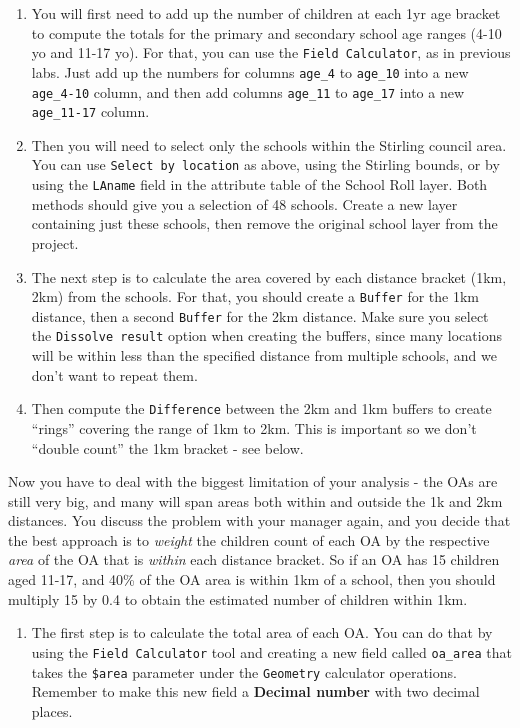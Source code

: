 \documentclass[
  letterpaper,
  DIV=11,
  numbers=noendperiod]{scrreprt}
\providecommand{\tightlist}{%
  \setlength{\itemsep}{0pt}\setlength{\parskip}{0pt}}\usepackage{longtable,booktabs,array}
\begin{document}
\begin{enumerate}
\def\labelenumi{(\arabic{enumi})}
\setcounter{enumi}{289}
\item
  You will first need to add up the number of children at each 1yr age
  bracket to compute the totals for the primary and secondary school age
  ranges (4-10 yo and 11-17 yo). For that, you can use the
  \texttt{Field\ Calculator}, as in previous labs. Just add up the
  numbers for columns \texttt{age\_4} to \texttt{age\_10} into a new
  \texttt{age\_4-10} column, and then add columns \texttt{age\_11} to
  \texttt{age\_17} into a new \texttt{age\_11-17} column.
\item
  Then you will need to select only the schools within the Stirling
  council area. You can use \texttt{Select\ by\ location} as above,
  using the Stirling bounds, or by using the \texttt{LAname} field in
  the attribute table of the School Roll layer. Both methods should give
  you a selection of 48 schools. Create a new layer containing just
  these schools, then remove the original school layer from the project.
\item
  The next step is to calculate the area covered by each distance
  bracket (1km, 2km) from the schools. For that, you should create a
  \texttt{Buffer} for the 1km distance, then a second \texttt{Buffer}
  for the 2km distance. Make sure you select the
  \texttt{Dissolve\ result} option when creating the buffers, since many
  locations will be within less than the specified distance from
  multiple schools, and we don't want to repeat them.
\item
  Then compute the \texttt{Difference} between the 2km and 1km buffers
  to create ``rings'' covering the range of 1km to 2km. This is
  important so we don't ``double count'' the 1km bracket - see below.
\end{enumerate}

Now you have to deal with the biggest limitation of your analysis - the
OAs are still very big, and many will span areas both within and outside
the 1k and 2km distances. You discuss the problem with your manager
again, and you decide that the best approach is to \emph{weight} the
children count of each OA by the respective \emph{area} of the OA that
is \emph{within} each distance bracket. So if an OA has 15 children aged
11-17, and 40\% of the OA area is within 1km of a school, then you
should multiply 15 by 0.4 to obtain the estimated number of children
within 1km.

\begin{enumerate}
\def\labelenumi{(\arabic{enumi})}
\setcounter{enumi}{293}
\tightlist
\item
  The first step is to calculate the total area of each OA. You can do
  that by using the \texttt{Field\ Calculator} tool and creating a new
  field called \texttt{oa\_area} that takes the \texttt{\$area}
  parameter under the \texttt{Geometry} calculator operations. Remember
  to make this new field a \textbf{Decimal number} with two decimal
  places.
\end{enumerate}
\end{document}

